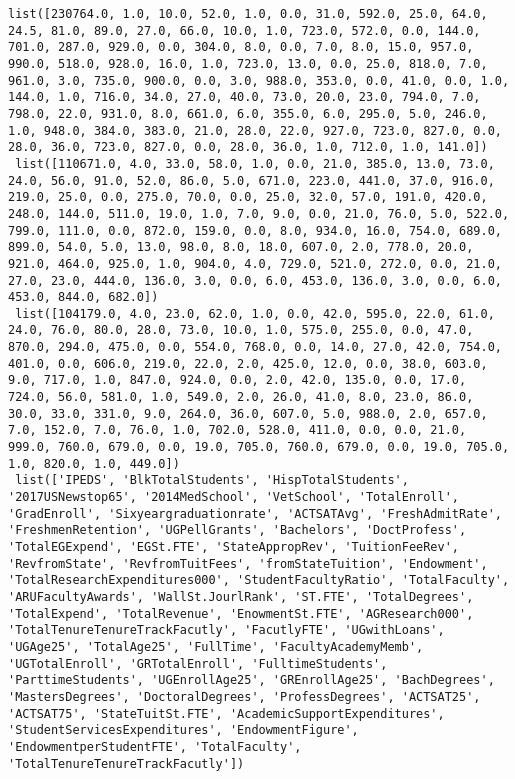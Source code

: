 \documentclass[11pt]{article}
\begin{document}
\begin{Verbatim}[commandchars=\\\{\}]
 list([230764.0, 1.0, 10.0, 52.0, 1.0, 0.0, 31.0, 592.0, 25.0, 64.0, 24.5, 81.0, 89.0, 27.0, 66.0, 10.0, 1.0, 723.0, 572.0, 0.0, 144.0, 701.0, 287.0, 929.0, 0.0, 304.0, 8.0, 0.0, 7.0, 8.0, 15.0, 957.0, 990.0, 518.0, 928.0, 16.0, 1.0, 723.0, 13.0, 0.0, 25.0, 818.0, 7.0, 961.0, 3.0, 735.0, 900.0, 0.0, 3.0, 988.0, 353.0, 0.0, 41.0, 0.0, 1.0, 144.0, 1.0, 716.0, 34.0, 27.0, 40.0, 73.0, 20.0, 23.0, 794.0, 7.0, 798.0, 22.0, 931.0, 8.0, 661.0, 6.0, 355.0, 6.0, 295.0, 5.0, 246.0, 1.0, 948.0, 384.0, 383.0, 21.0, 28.0, 22.0, 927.0, 723.0, 827.0, 0.0, 28.0, 36.0, 723.0, 827.0, 0.0, 28.0, 36.0, 1.0, 712.0, 1.0, 141.0])
 list([110671.0, 4.0, 33.0, 58.0, 1.0, 0.0, 21.0, 385.0, 13.0, 73.0, 24.0, 56.0, 91.0, 52.0, 86.0, 5.0, 671.0, 223.0, 441.0, 37.0, 916.0, 219.0, 25.0, 0.0, 275.0, 70.0, 0.0, 25.0, 32.0, 57.0, 191.0, 420.0, 248.0, 144.0, 511.0, 19.0, 1.0, 7.0, 9.0, 0.0, 21.0, 76.0, 5.0, 522.0, 799.0, 111.0, 0.0, 872.0, 159.0, 0.0, 8.0, 934.0, 16.0, 754.0, 689.0, 899.0, 54.0, 5.0, 13.0, 98.0, 8.0, 18.0, 607.0, 2.0, 778.0, 20.0, 921.0, 464.0, 925.0, 1.0, 904.0, 4.0, 729.0, 521.0, 272.0, 0.0, 21.0, 27.0, 23.0, 444.0, 136.0, 3.0, 0.0, 6.0, 453.0, 136.0, 3.0, 0.0, 6.0, 453.0, 844.0, 682.0])
 list([104179.0, 4.0, 23.0, 62.0, 1.0, 0.0, 42.0, 595.0, 22.0, 61.0, 24.0, 76.0, 80.0, 28.0, 73.0, 10.0, 1.0, 575.0, 255.0, 0.0, 47.0, 870.0, 294.0, 475.0, 0.0, 554.0, 768.0, 0.0, 14.0, 27.0, 42.0, 754.0, 401.0, 0.0, 606.0, 219.0, 22.0, 2.0, 425.0, 12.0, 0.0, 38.0, 603.0, 9.0, 717.0, 1.0, 847.0, 924.0, 0.0, 2.0, 42.0, 135.0, 0.0, 17.0, 724.0, 56.0, 581.0, 1.0, 549.0, 2.0, 26.0, 41.0, 8.0, 23.0, 86.0, 30.0, 33.0, 331.0, 9.0, 264.0, 36.0, 607.0, 5.0, 988.0, 2.0, 657.0, 7.0, 152.0, 7.0, 76.0, 1.0, 702.0, 528.0, 411.0, 0.0, 0.0, 21.0, 999.0, 760.0, 679.0, 0.0, 19.0, 705.0, 760.0, 679.0, 0.0, 19.0, 705.0, 1.0, 820.0, 1.0, 449.0])
 list(['IPEDS', 'BlkTotalStudents', 'HispTotalStudents', '2017USNewstop65', '2014MedSchool', 'VetSchool', 'TotalEnroll', 'GradEnroll', 'Sixyeargraduationrate', 'ACTSATAvg', 'FreshAdmitRate', 'FreshmenRetention', 'UGPellGrants', 'Bachelors', 'DoctProfess', 'TotalEGExpend', 'EGSt.FTE', 'StateAppropRev', 'TuitionFeeRev', 'RevfromState', 'RevfromTuitFees', 'fromStateTuition', 'Endowment', 'TotalResearchExpenditures000', 'StudentFacultyRatio', 'TotalFaculty', 'ARUFacultyAwards', 'WallSt.JourlRank', 'ST.FTE', 'TotalDegrees', 'TotalExpend', 'TotalRevenue', 'EnowmentSt.FTE', 'AGResearch000', 'TotalTenureTenureTrackFacutly', 'FacutlyFTE', 'UGwithLoans', 'UGAge25', 'TotalAge25', 'FullTime', 'FacultyAcademyMemb', 'UGTotalEnroll', 'GRTotalEnroll', 'FulltimeStudents', 'ParttimeStudents', 'UGEnrollAge25', 'GREnrollAge25', 'BachDegrees', 'MastersDegrees', 'DoctoralDegrees', 'ProfessDegrees', 'ACTSAT25', 'ACTSAT75', 'StateTuitSt.FTE', 'AcademicSupportExpenditures', 'StudentServicesExpenditures', 'EndowmentFigure', 'EndowmentperStudentFTE', 'TotalFaculty', 'TotalTenureTenureTrackFacutly'])

\end{Verbatim}
\end{document}
